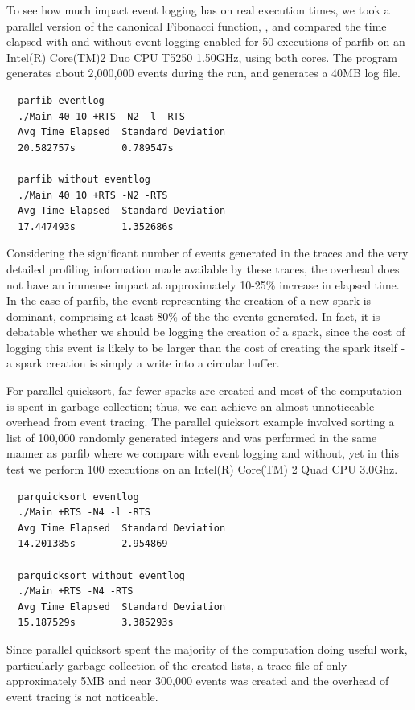 To see how much impact event logging has on real execution times, we
took a parallel version of the canonical Fibonacci function,
, and compared the time elapsed with and without event
logging enabled for 50 executions of parfib on an Intel(R) Core(TM)2
Duo CPU T5250 1.50GHz, using both cores.  The program generates about
2,000,000 events during the run, and generates a 40MB log file.

\begin{verbatim}
  parfib eventlog 
  ./Main 40 10 +RTS -N2 -l -RTS
  Avg Time Elapsed  Standard Deviation
  20.582757s        0.789547s

  parfib without eventlog 
  ./Main 40 10 +RTS -N2 -RTS
  Avg Time Elapsed  Standard Deviation
  17.447493s        1.352686s
\end{verbatim}

Considering the significant number of events generated in the traces
and the very detailed profiling information made available by these
traces, the overhead does not have an immense impact at approximately
10-25\% increase in elapsed time.  In the case of parfib, the event
representing the creation of a new spark is dominant, comprising at
least 80\% of the the events generated.  In fact, it is debatable
whether we should be logging the creation of a spark, since the cost
of logging this event is likely to be larger than the cost of creating
the spark itself - a spark creation is simply a write into a circular
buffer.
  
For parallel quicksort, far fewer sparks are created and most of the
computation is spent in garbage collection; thus, we can achieve an
almost unnoticeable overhead from event tracing.  The parallel quicksort
example involved sorting a list of 100,000 randomly generated integers
and was performed in the same manner as parfib where we compare with
event logging and without, yet in this test we perform 100 executions 
on an Intel(R) Core(TM) 2 Quad CPU 3.0Ghz. 

\begin{verbatim}
  parquicksort eventlog 
  ./Main +RTS -N4 -l -RTS 
  Avg Time Elapsed  Standard Deviation
  14.201385s        2.954869

  parquicksort without eventlog 
  ./Main +RTS -N4 -RTS 
  Avg Time Elapsed  Standard Deviation
  15.187529s        3.385293s

\end{verbatim}

Since parallel quicksort spent the majority of the computation doing
useful work, particularly garbage collection of the created lists, a
trace file of only approximately 5MB and near 300,000 events was
created and the overhead of event tracing is not noticeable.

